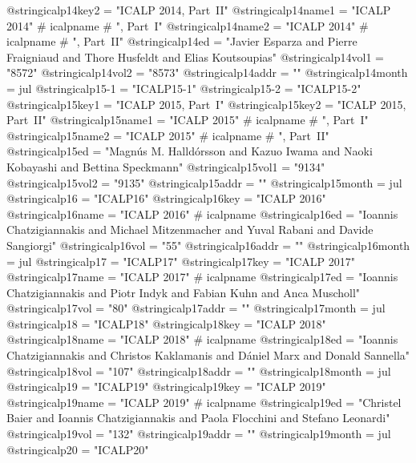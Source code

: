 @string{icalp14key2 =           "ICALP 2014, Part~II"}
@string{icalp14name1 =          "ICALP 2014" # icalpname # ", Part~I"}
@string{icalp14name2 =          "ICALP 2014" # icalpname # ", Part~II"}
@string{icalp14ed =             "Javier Esparza and Pierre Fraigniaud and Thore Husfeldt and Elias Koutsoupias"}
@string{icalp14vol1 =           "8572"}
@string{icalp14vol2 =           "8573"}
@string{icalp14addr =           ""}
@string{icalp14month =          jul}
@string{icalp15-1 =             "ICALP15-1"}
@string{icalp15-2 =             "ICALP15-2"}
@string{icalp15key1 =           "ICALP 2015, Part~I"}
@string{icalp15key2 =           "ICALP 2015, Part~II"}
@string{icalp15name1 =          "ICALP 2015" # icalpname # ", Part~I"}
@string{icalp15name2 =          "ICALP 2015" # icalpname # ", Part~II"}
@string{icalp15ed =             "Magn{\'u}s M. Halld{\'o}rsson and Kazuo Iwama and Naoki Kobayashi and Bettina Speckmann"}
@string{icalp15vol1 =           "9134"}
@string{icalp15vol2 =           "9135"}
@string{icalp15addr =           ""}
@string{icalp15month =          jul}
@string{icalp16 =               "ICALP16"}
@string{icalp16key =            "ICALP 2016"}
@string{icalp16name =           "ICALP 2016" # icalpname}
@string{icalp16ed =             "Ioannis Chatzigiannakis and Michael Mitzenmacher and Yuval Rabani and Davide Sangiorgi"}
@string{icalp16vol =            "55"}
@string{icalp16addr =           ""}
@string{icalp16month =          jul}
@string{icalp17 =               "ICALP17"}
@string{icalp17key =            "ICALP 2017"}
@string{icalp17name =           "ICALP 2017" # icalpname}
@string{icalp17ed =             "Ioannis Chatzigiannakis and Piotr Indyk and Fabian Kuhn and Anca Muscholl"}
@string{icalp17vol =            "80"}
@string{icalp17addr =           ""}
@string{icalp17month =          jul}
@string{icalp18 =               "ICALP18"}
@string{icalp18key =            "ICALP 2018"}
@string{icalp18name =           "ICALP 2018" # icalpname}
@string{icalp18ed =             "Ioannis Chatzigiannakis and Christos Kaklamanis and D{\'a}niel Marx and Donald Sannella"}
@string{icalp18vol =            "107"}
@string{icalp18addr =           ""}
@string{icalp18month =          jul}
@string{icalp19 =               "ICALP19"}
@string{icalp19key =            "ICALP 2019"}
@string{icalp19name =           "ICALP 2019" # icalpname}
@string{icalp19ed =             "Christel Baier and Ioannis Chatzigiannakis and Paola Flocchini and Stefano Leonardi"}
@string{icalp19vol =            "132"}
@string{icalp19addr =           ""}
@string{icalp19month =          jul}
@string{icalp20 =               "ICALP20"}
